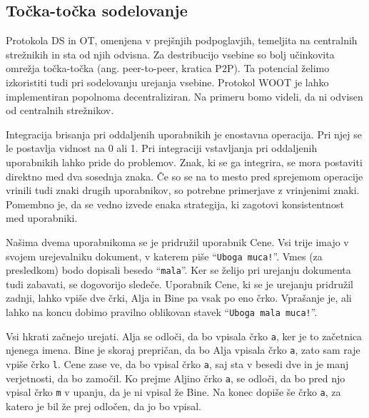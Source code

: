 \documentclass[a4paper, 12pt, twoside]{book}
\begin{document}
\subsection{Točka-točka sodelovanje}

Protokola DS in OT, omenjena v prejšnjih podpoglavjih, temeljita na centralnih strežnikih in sta od njih odvisna. Za destribucijo vsebine so bolj učinkovita omrežja točka-točka (ang. peer-to-peer, kratica P2P). Ta potencial želimo izkoristiti tudi pri sodelovanju urejanja vsebine. Protokol WOOT je lahko implementiran popolnoma decentraliziran. Na primeru bomo videli, da ni odvisen od centralnih strežnikov.

Integracija brisanja pri oddaljenih uporabnikih je enostavna operacija. Pri njej se le postavlja vidnost na 0 ali 1. Pri integraciji vstavljanja pri oddaljenih uporabnikih lahko pride do problemov. Znak, ki se ga integrira, se mora postaviti direktno med dva sosednja znaka. Če so se na to mesto pred sprejemom operacije vrinili tudi znaki drugih uporabnikov, so potrebne primerjave z vrinjenimi znaki. Pomembno je, da se vedno izvede enaka strategija, ki zagotovi konsistentnost med uporabniki.

Našima dvema uporabnikoma se je pridružil uporabnik Cene. Vsi trije imajo v svojem urejevalniku dokument, v katerem piše “{\tt Uboga muca!}”. Vmes (za presledkom) bodo dopisali besedo “{\tt mala}”. Ker se želijo pri urejanju dokumenta tudi zabavati, se dogovorijo sledeče. Uporabnik Cene, ki se je urejanju pridružil zadnji, lahko vpiše dve črki, Alja in Bine pa vsak po eno črko. Vprašanje je, ali lahko na koncu dobimo pravilno oblikovan stavek “{\tt Uboga mala muca!}”.

Vsi hkrati začnejo urejati. Alja se odloči, da bo vpisala črko {\tt a}, ker je to začetnica njenega imena. Bine je skoraj prepričan, da bo Alja vpisala črko {\tt a}, zato sam raje vpiše črko {\tt l}. Cene zase ve, da bo vpisal črko {\tt a}, saj sta v besedi dve in je manj verjetnosti, da bo zamočil. Ko prejme Aljino črko {\tt a}, se odloči, da bo pred njo vpisal črko {\tt m} v upanju, da je ni vpisal že Bine. Na konec dopiše še črko {\tt a}, za katero je bil že prej odločen, da jo bo vpisal.
\end{document}
